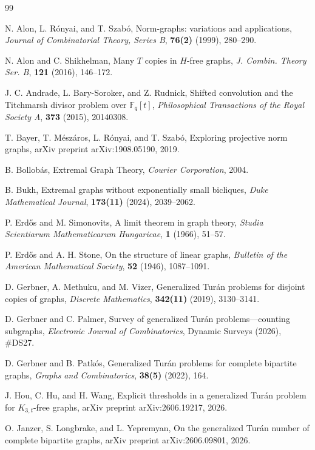 \documentclass[11pt,a4paper]{article}
\theoremstyle{definition}
\theoremstyle{remark}
\begin{document}
\begin{thebibliography}{99}


 N. Alon, L. R\'onyai, and T. Szab\'o, Norm-graphs: variations and applications, \textit{Journal of Combinatorial Theory, Series B}, {\bf76(2)} (1999), 280--290.

 N. Alon and C. Shikhelman, Many $T$ copies in $H$-free graphs, \textit{J. Combin. Theory Ser. B}, {\bf121} (2016), 146--172.

 J. C. Andrade, L. Bary-Soroker, and Z. Rudnick, Shifted convolution and the Titchmarsh divisor problem over $\mathbb{F}_q[t]$, \textit{Philosophical Transactions of the Royal Society A}, {\bf373} (2015), 20140308.

 T. Bayer, T. M\'esz\'aros, L. R\'onyai, and T. Szab\'o, Exploring projective norm graphs, arXiv preprint arXiv:1908.05190, 2019.

 B. Bollob\'{a}s, Extremal Graph Theory, \textit{Courier Corporation}, 2004.


 B. Bukh, Extremal graphs without exponentially small bicliques, \textit{Duke Mathematical Journal}, {\bf173(11)} (2024), 2039--2062.

 P. Erd\H{o}s and M. Simonovits, A limit theorem in graph theory, \textit{Studia Scientiarum Mathematicarum Hungaricae}, {\bf1} (1966), 51--57.

 P. Erd\H{o}s and A. H. Stone, On the structure of linear graphs, \textit{Bulletin of the American Mathematical Society}, {\bf52} (1946), 1087--1091.

 D. Gerbner, A. Methuku, and M. Vizer, Generalized Tur\'an problems for disjoint copies of graphs, \textit{Discrete Mathematics}, {\bf342(11)} (2019), 3130--3141.

 D. Gerbner and C. Palmer, Survey of generalized Tur\'{a}n problems---counting subgraphs, \textit{Electronic Journal of Combinatorics}, Dynamic Surveys (2026), \#DS27.

 D. Gerbner and B. Patk\'os, Generalized Tur\'an problems for complete bipartite graphs, \textit{Graphs and Combinatorics}, {\bf38(5)} (2022), 164.

 J. Hou, C. Hu, and H. Wang, Explicit thresholds in a generalized Tur\'{a}n problem for $K_{3,t}$-free graphs, arXiv preprint arXiv:2606.19217, 2026.


 O. Janzer, S. Longbrake, and L. Yepremyan, On the generalized Tur\'{a}n number of complete bipartite graphs, arXiv preprint arXiv:2606.09801, 2026.


\end{thebibliography}
\end{document}

